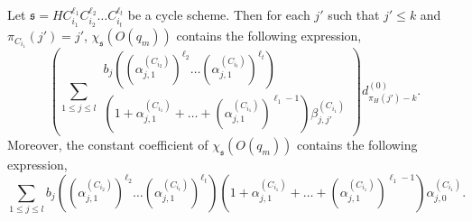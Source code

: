 \documentclass[runningheads,a4paper]{llncs}
\def\schm{{\mathfrak{s} }}
\begin{document}
\begin{proposition}\label{prop-cycle-schm}
Let $\schm=HC_{i_1}^{\ell_1} C_{i_2}^{\ell_2} \dots C_{i_t}^{\ell_t}$ be a cycle scheme. Then for each $j'$ such that $j' \le k$ and $\pi_{C_{i_1}}(j')=j'$, $\chi_{\schm}(O(q_m))$ contains the following expression,
\[
\left(\sum \limits_{1 \le j \le l} 
\begin{array}{l}
b_j \left((\alpha^{(C_{i_2})}_{j,1})^{\ell_2} \dots (\alpha^{(C_{i_t})}_{j,1})^{\ell_t}\right) \\
\left(1+\alpha^{(C_{i_1})}_{j,1} + \dots + (\alpha^{(C_{i_1})}_{j,1})^{\ell_1-1} \right) \beta^{(C_{i_1})}_{j,j'}
\end{array}
\right) d^{(0)}_{\pi_H(j')-k}. 
\]
Moreover, the constant coefficient of $\chi_\schm(O(q_m))$ contains the following expression,
\[
\sum \limits_{1 \le j \le l} 
b_j \left((\alpha^{(C_{i_2})}_{j,1})^{\ell_2} \dots (\alpha^{(C_{i_t})}_{j,1})^{\ell_t}\right) 
\left(1+\alpha^{(C_{i_1})}_{j,1} + \dots + (\alpha^{(C_{i_1})}_{j,1})^{\ell_1-1} \right) \alpha^{(C_{i_1})}_{j,0}.
\]
\end{proposition}
\end{document}
